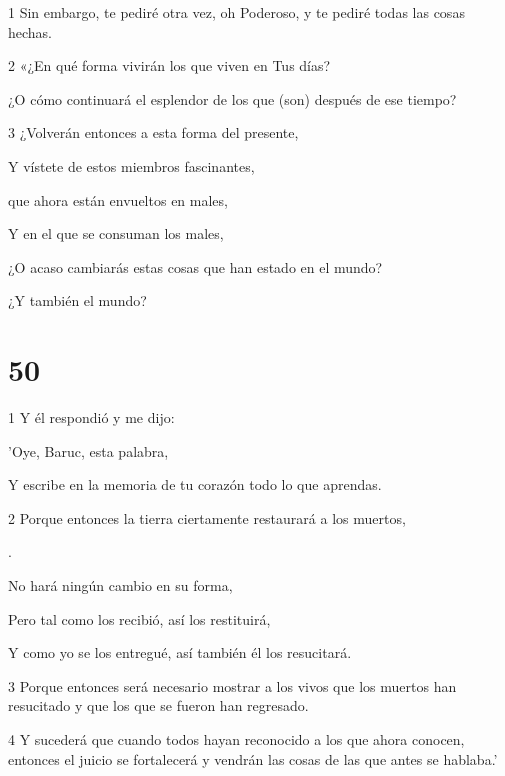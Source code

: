 \par 1 Sin embargo, te pediré otra vez, oh Poderoso, y te pediré todas las cosas hechas.

\par 2 «¿En qué forma vivirán los que viven en Tus días?

\par ¿O cómo continuará el esplendor de los que (son) después de ese tiempo?

\par 3 ¿Volverán entonces a esta forma del presente,

\par Y vístete de estos miembros fascinantes,

\par que ahora están envueltos en males,

\par Y en el que se consuman los males,

\par ¿O acaso cambiarás estas cosas que han estado en el mundo?

\par ¿Y también el mundo?

\chapter{50}

\par 1 Y él respondió y me dijo:

\par 'Oye, Baruc, esta palabra,

Y escribe en la memoria de tu corazón todo lo que aprendas.

\par 2 Porque entonces la tierra ciertamente restaurará a los muertos,

\par [Que ahora recibe, para poder conservarlos].

\par No hará ningún cambio en su forma,

Pero tal como los recibió, así los restituirá,

Y como yo se los entregué, así también él los resucitará.

\par 3 Porque entonces será necesario mostrar a los vivos que los muertos han resucitado y que los que se fueron han regresado.

\par 4 Y sucederá que cuando todos hayan reconocido a los que ahora conocen, entonces el juicio se fortalecerá y vendrán las cosas de las que antes se hablaba.'

